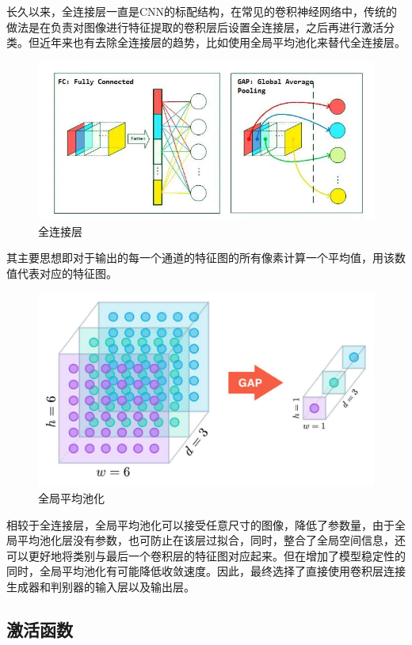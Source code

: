 \documentclass[hyperref, a4paper]{ctexart}
\begin{document}
长久以来，全连接层一直是CNN的标配结构，在常见的卷积神经网络中，传统的做法是在负责对图像进行特征提取的卷积层后设置全连接层，之后再进行激活分类。但近年来也有去除全连接层的趋势，比如使用全局平均池化来替代全连接层。

\begin{figure}
\centering
\includegraphics{./10.png}
\caption{全连接层}
\end{figure}

其主要思想即对于输出的每一个通道的特征图的所有像素计算一个平均值，用该数值代表对应的特征图。

\begin{figure}
\centering
\includegraphics{./11.jpg}
\caption{全局平均池化}
\end{figure}

相较于全连接层，全局平均池化可以接受任意尺寸的图像，降低了参数量，由于全局平均池化层没有参数，也可防止在该层过拟合，同时，整合了全局空间信息，还可以更好地将类别与最后一个卷积层的特征图对应起来。但在增加了模型稳定性的同时，全局平均池化有可能降低收敛速度。因此，最终选择了直接使用卷积层连接生成器和判别器的输入层以及输出层。

\hypertarget{ux6fc0ux6d3bux51fdux6570}{%
\subsection{激活函数}\label{ux6fc0ux6d3bux51fdux6570}}
\end{document}
